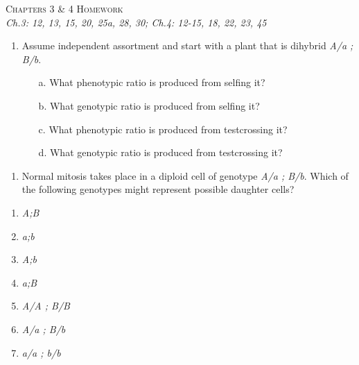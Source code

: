 \documentclass[11pt,]{article}
\providecommand{\tightlist}{%
  \setlength{\itemsep}{0pt}\setlength{\parskip}{0pt}}
\begin{document}
\begin{center}
\Large{\textsc{Chapters 3 \& 4 Homework}}\\ \small{\textit{Ch.3: 12, 13,
15, 20, 25a, 28, 30; Ch.4: 12-15, 18, 22, 23, 45}}\\
\vspace*{\baselineskip}
\end{center}

\begin{blackbox}

\begin{enumerate}
\def\labelenumi{\arabic{enumi}.}
\setcounter{enumi}{11}
\tightlist
\item
  Assume independent assortment and start with a plant that is dihybrid
  \emph{A/a ; B/b}.

  \begin{enumerate} 
   \item[a.]{ What phenotypic ratio is produced from selfing it? } 
   \item[b.]{ What genotypic ratio is produced from selfing it? } 
   \item[c.]{ What phenotypic ratio is produced from testcrossing it? } 
   \item[d.]{ What genotypic ratio is produced from testcrossing it? } 
   \end{enumerate}
\end{enumerate}

\vspace{17cm}

\end{blackbox}

\begin{blackbox}

\begin{enumerate}
\def\labelenumi{\arabic{enumi}.}
\setcounter{enumi}{12}
\tightlist
\item
  Normal mitosis takes place in a diploid cell of genotype \emph{A/a ;
  B/b}. Which of the following genotypes might represent possible
  daughter cells?
\end{enumerate}

\hfill\break

\begin{enumerate}
\def\labelenumi{\alph{enumi}.}
\item
  \emph{A;B}
\item
  \emph{a;b}
\item
  \emph{A;b}
\item
  \emph{a;B}
\item
  \emph{A/A ; B/B}
\item
  \emph{A/a ; B/b}
\item
  \emph{a/a ; b/b}
\end{enumerate}

\vspace{15cm}

\end{blackbox}
\end{document}
